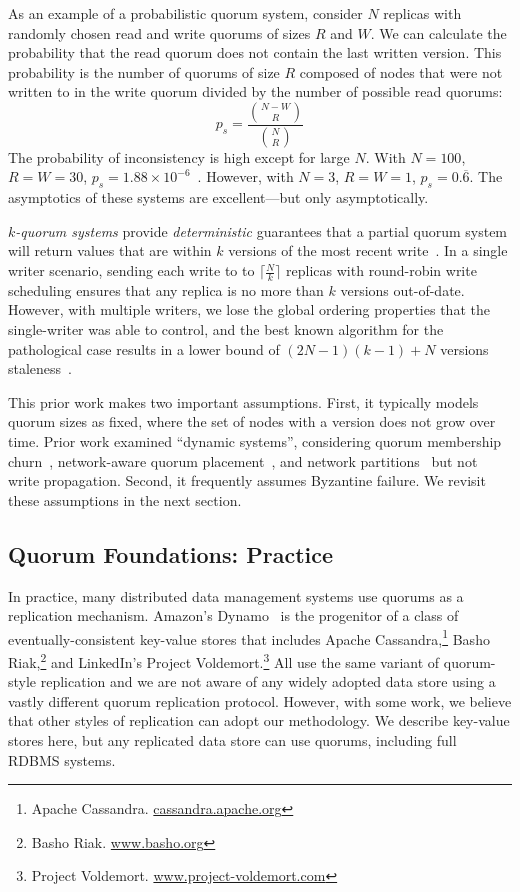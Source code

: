 \documentclass{vldb}
\newcommand{\subsectionskip}{-0em}
\begin{document}
As an example of a probabilistic quorum system, consider $N$ replicas
with randomly chosen read and write quorums of sizes $R$ and $W$. We
can calculate the probability that the read quorum does not contain
the last written version. This probability is the number of quorums of
size $R$ composed of nodes that were not written to in the write
quorum divided by the number of possible read quorums:
\begin{equation}
\label{eq:prob-strict}
p_{s}=\frac{{N-W \choose R}}{{N \choose R}}
\end{equation}
The probability of inconsistency is high except for large $N$.  With
$N=100$, $R=W=30$, $p_{s} = 1.88 \times
10^{-6}$~\cite{non-strict}.  However, with $N=3$, $R=W=1$, $p_{s}
= 0.\overline{6}$.  The asymptotics of these systems are
excellent---but only asymptotically.

\textit{$k$-quorum systems} provide \textit{deterministic} guarantees
that a partial quorum system will return values that are within $k$
versions of the most recent write~\cite{non-strict}.  In a single
writer scenario, sending each write to to $\lceil\frac{N}{k}\rceil$
replicas with round-robin write scheduling ensures that any replica is
no more than $k$ versions out-of-date.  However, with multiple
writers, we lose the global ordering properties that the single-writer
was able to control, and the best known algorithm for the pathological
case results in a lower bound of $(2N-1)(k-1)+N$ versions
staleness~\cite{multi-k-quorum}.

This prior work makes two important assumptions. First, it typically
models quorum sizes as fixed, where the set of nodes with a version
does not grow over time.  Prior work examined ``dynamic systems'',
considering quorum membership churn~\cite{prob-quorum-dynamic},
network-aware quorum placement~\cite{delay-quorum, quorum-placement},
and network partitions~\cite{partitionedquorum} but not write
propagation. Second, it frequently assumes Byzantine failure.  We
revisit these assumptions in the next section.

\vspace{\subsectionskip}\subsection{Quorum Foundations: Practice}
\label{sec:practice}

In practice, many distributed data management systems use quorums as a
replication mechanism. Amazon's Dynamo~\cite{dynamo} is the progenitor
of a class of eventually-consistent key-value stores that includes
Apache Cassandra,\footnote{Apache Cassandra.
  \url{cassandra.apache.org}} Basho Riak,\footnote{Basho Riak.
  \url{www.basho.org}} and LinkedIn's Project
Voldemort.\footnote{Project Voldemort.
  \url{www.project-voldemort.com}}  All use the same variant of
quorum-style replication and we are not aware of any widely adopted
data store using a vastly different quorum replication protocol.  However,
with some work, we believe that other styles of replication can adopt
our methodology.  We describe key-value stores here, but any
replicated data store can use quorums, including full RDBMS systems.
\end{document}
